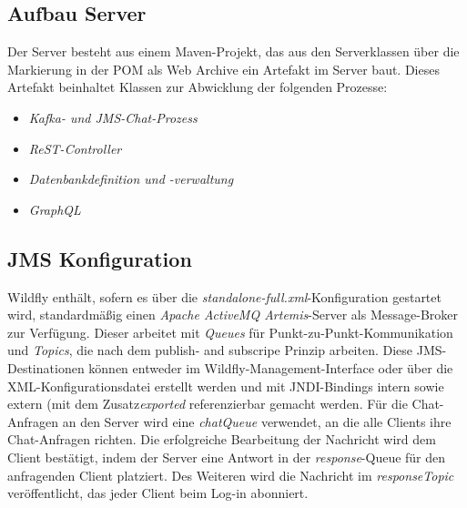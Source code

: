 \documentclass[10pt,journal,compsoc]{IEEEtran}
\begin{document}
\subsection{Aufbau Server}
Der Server besteht aus einem Maven-Projekt, das aus den Serverklassen über die Markierung in der POM als Web Archive ein Artefakt im Server baut.
Dieses Artefakt beinhaltet Klassen zur Abwicklung der folgenden Prozesse:
\begin{itemize}
	\item{\textit{Kafka- und JMS-Chat-Prozess}}
	\item{\textit{ReST-Controller}}
	\item{\textit{Datenbankdefinition und -verwaltung}}
	\item{\textit{GraphQL}}
\end{itemize}

\subsection{JMS Konfiguration}
Wildfly enthält, sofern es über die \textit{standalone-full.xml}-Konfiguration gestartet wird, standardmäßig einen \textit{Apache ActiveMQ Artemis}-Server als Message-Broker zur Verfügung. Dieser arbeitet mit \textit{Queues} für Punkt-zu-Punkt-Kommunikation und \textit{Topics}, die nach dem publish- and subscripe Prinzip arbeiten. Diese JMS-Destinationen können entweder im Wildfly-Management-Interface oder über die XML-Konfigurationsdatei erstellt werden und mit JNDI-Bindings intern sowie extern (mit dem Zusatz\textit{exported} referenzierbar gemacht werden.
Für die Chat-Anfragen an den Server wird eine \textit{chatQueue}	verwendet, an die alle Clients ihre Chat-Anfragen richten. Die erfolgreiche Bearbeitung der Nachricht wird dem Client bestätigt, indem der Server eine Antwort in der \textit{response}-Queue für den anfragenden Client platziert. Des Weiteren wird die Nachricht im \textit{responseTopic} veröffentlicht, das jeder Client beim Log-in abonniert.
\end{document}

